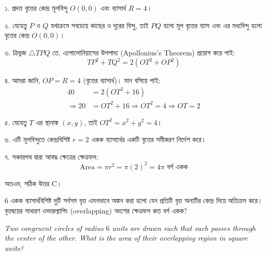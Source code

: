 \documentclass[12pt, a4paper]{article}
\begin{document}
\begin{tcolorbox}[solutionbox={সমাধান (Solution)}]
    \noindent
    ১. প্রদত্ত বৃত্তের কেন্দ্র মূলবিন্দু $O(0, 0)$ এবং ব্যাসার্ধ $R = 4$।
    
    \vspace{0.5em}
    ২. যেহেতু $P$ ও $Q$ যথাক্রমে সবচেয়ে কাছের ও দূরের বিন্দু, তাই $PQ$ হলো মূল বৃত্তের ব্যাস এবং এর মধ্যবিন্দু হলো বৃত্তের কেন্দ্র $O(0, 0)$।
    
    \vspace{0.5em}
    ৩. ত্রিভুজ $\triangle TPQ$ তে, এপোলোনিয়াসের উপপাদ্য (Apollonius's Theorem) প্রয়োগ করে পাই:
    \[ TP^2 + TQ^2 = 2(OT^2 + OP^2) \]
    
    \vspace{0.5em}
    ৪. আমরা জানি, $OP = R = 4$ (বৃত্তের ব্যাসার্ধ)। মান বসিয়ে পাই:
    \begin{align*}
        40 &= 2(OT^2 + 16) \\
        \Rightarrow 20 &= OT^2 + 16 \Rightarrow OT^2 = 4 \Rightarrow OT = 2
    \end{align*}
    
    \vspace{0.5em}
    ৫. যেহেতু $T$ এর স্থানাঙ্ক $(x, y)$, তাই $OT^2 = x^2 + y^2 = 4$।
    
    \vspace{0.5em}
    ৬. এটি মূলবিন্দুতে কেন্দ্রবিশিষ্ট $r = 2$ একক ব্যাসার্ধের একটি বৃত্তের সমীকরণ নির্দেশ করে।
    
    \vspace{0.5em}
    ৭. সঞ্চারপথ দ্বারা আবদ্ধ ক্ষেত্রের ক্ষেত্রফল:
    \[ \text{Area} = \pi r^2 = \pi (2)^2 = 4\pi \text{ বর্গ একক} \]
    
    \vspace{0.5em}
    অতএব, সঠিক উত্তর C।
\end{tcolorbox}

\begin{tcolorbox}[questionbox={প্রশ্ন (Question) 47}]
    \noindent
    $6$ একক ব্যাসার্ধবিশিষ্ট দুটি সর্বসম বৃত্ত এমনভাবে অঙ্কন করা হলো যেন প্রতিটি বৃত্ত অন্যটির কেন্দ্র দিয়ে অতিক্রম করে। বৃত্তদ্বয়ের সাধারণ ওভারল্যাপিং (overlapping) অংশের ক্ষেত্রফল কত বর্গ একক?
    
    \vspace{0.8em}
    \begin{english}
    \noindent\textit{\color{darkgray}
    Two congruent circles of radius $6$ units are drawn such that each passes through the center of the other. What is the area of their overlapping region in square units?
    }
    \end{english}
\end{tcolorbox}
\end{document}
